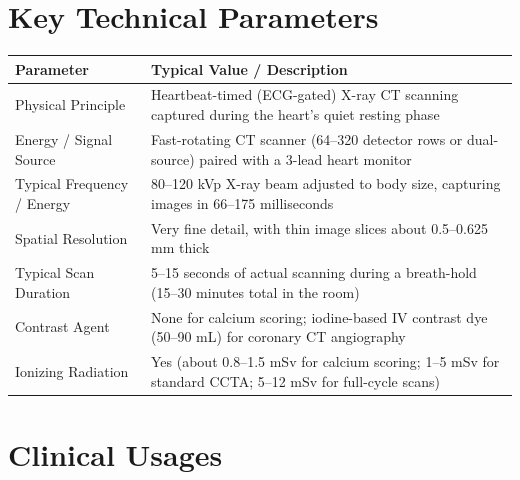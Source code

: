 \section{Key Technical Parameters}
\noindent
\begin{tabularx}{\textwidth}{@{}l X@{}}
\toprule
\textbf{Parameter} & \textbf{Typical Value / Description} \\
\midrule
Physical Principle & Heartbeat-timed (ECG-gated) X-ray CT scanning captured during the heart's quiet resting phase \\
Energy / Signal Source & Fast-rotating CT scanner (64--320 detector rows or dual-source) paired with a 3-lead heart monitor \\
Typical Frequency / Energy & 80--120 kVp X-ray beam adjusted to body size, capturing images in 66--175 milliseconds \\
Spatial Resolution & Very fine detail, with thin image slices about 0.5--0.625 mm thick \\
Typical Scan Duration & 5--15 seconds of actual scanning during a breath-hold (15--30 minutes total in the room) \\
Contrast Agent & None for calcium scoring; iodine-based IV contrast dye (50--90 mL) for coronary CT angiography \\
Ionizing Radiation & Yes (about 0.8--1.5 mSv for calcium scoring; 1--5 mSv for standard CCTA; 5--12 mSv for full-cycle scans) \\
\bottomrule
\end{tabularx}

\section{Clinical Usages}

